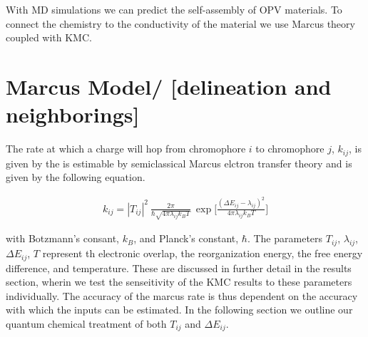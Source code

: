 
With MD simulations we can predict the self-assembly of OPV materials. To connect the chemistry to the
conductivity of the material we use Marcus theory coupled with KMC.

\section{Marcus Model/  [delineation and neighborings]}
\label{marcus}
The rate at which a charge will hop from chromophore $i$ to chromophore $j$, $k_{ij}$, is given by the
is estimable by semiclassical Marcus elctron transfer theory and is given by the following equation.

\begin{align}
    k_{ij}  =  |T_{ij}|^2\ \frac{2\pi}{\hbar \sqrt{4 \pi \lambda_{ij} k_{B} T}}\ \exp{\Bigg[ \frac{(\Delta
    E_{ij} - \lambda_{ij})^2}{ 4 \pi \lambda_{ij} k_{B} T} \Bigg] }
    \label{marcus}
\end{align}

with Botzmann's consant, $k_{B}$, and Planck's constant, $\hbar$. The parameters $T_{ij}$, $\lambda_{ij}$,
$\Delta E_{ij}$, $T$ represent th electronic overlap, the reorganization energy, the free energy difference, and
temperature. These are discussed in further detail in the results section, wherin we test the senseitivity of
the KMC results to these parameters individually. 
The accuracy of the marcus rate is thus dependent on the accuracy with which the inputs can be estimated. In
the following section we outline our quantum chemical treatment of both $T_{ij}$ and $\Delta E_{ij}$.

